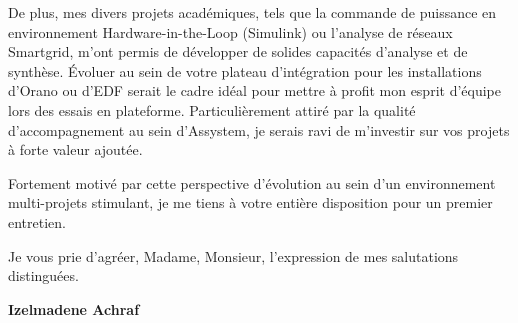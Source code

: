 \documentclass[10pt,a4paper]{../../altacv}
\begin{document}
\vspace{0.4cm}

De plus, mes divers projets académiques, tels que la commande de puissance en environnement Hardware-in-the-Loop (Simulink) ou l'analyse de réseaux Smartgrid, m'ont permis de développer de solides capacités d'analyse et de synthèse. Évoluer au sein de votre plateau d'intégration pour les installations d'Orano ou d'EDF serait le cadre idéal pour mettre à profit mon esprit d'équipe lors des essais en plateforme. Particulièrement attiré par la qualité d'accompagnement au sein d'Assystem, je serais ravi de m'investir sur vos projets à forte valeur ajoutée.

\vspace{0.4cm}

Fortement motivé par cette perspective d'évolution au sein d'un environnement multi-projets stimulant, je me tiens à votre entière disposition pour un premier entretien.

\vspace{0.5cm}

Je vous prie d'agréer, Madame, Monsieur, l'expression de mes salutations distinguées.

\vfill

\begin{flushright}
  \Large\color{emphasis}\textbf{Izelmadene Achraf}
\end{flushright}
\end{document}
